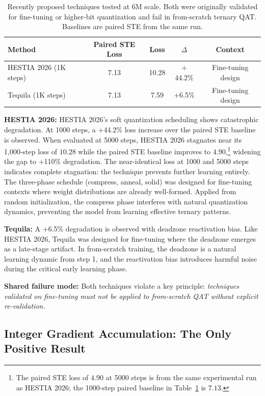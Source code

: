 \documentclass{article}
\begin{document}
\begin{table}[t]
\centering
\small
\caption{Recently proposed techniques tested at 6M scale. Both were originally validated for fine-tuning or higher-bit quantization and fail in from-scratch ternary QAT. Baselines are paired STE from the same run.}
\label{tab:recent}
\begin{tabular}{lcccc}
\toprule
\textbf{Method} & \textbf{Paired STE Loss} & \textbf{Loss} & \textbf{$\Delta$} & \textbf{Context} \\
\midrule
HESTIA 2026 (1K steps) & 7.13 & 10.28 & $+$44.2\% & Fine-tuning design \\
Tequila (1K steps) & 7.13 & 7.59 & $+$6.5\% & Fine-tuning design \\
\bottomrule
\end{tabular}
\end{table}

\textbf{HESTIA 2026:} HESTIA 2026's soft quantization scheduling shows catastrophic degradation. At 1000 steps, a $+$44.2\% loss increase over the paired STE baseline is observed. When evaluated at 5000 steps, HESTIA 2026 stagnates near its 1{,}000-step loss of $10.28$ while the paired STE baseline improves to $4.90$,\footnote{The paired STE loss of $4.90$ at 5000 steps is from the same experimental run as HESTIA 2026; the 1000-step paired baseline in Table~\ref{tab:recent} is $7.13$.} widening the gap to $+$110\% degradation. The near-identical loss at 1000 and 5000 steps indicates complete stagnation: the technique prevents further learning entirely. The three-phase schedule (compress, anneal, solid) was designed for fine-tuning contexts where weight distributions are already well-formed. Applied from random initialization, the compress phase interferes with natural quantization dynamics, preventing the model from learning effective ternary patterns.

\textbf{Tequila:} A $+$6.5\% degradation is observed with deadzone reactivation bias. Like HESTIA 2026, Tequila was designed for fine-tuning where the deadzone emerges as a late-stage artifact. In from-scratch training, the deadzone is a natural learning dynamic from step 1, and the reactivation bias introduces harmful noise during the critical early learning phase.

\textbf{Shared failure mode:} Both techniques violate a key principle: \textit{techniques validated on fine-tuning must not be applied to from-scratch QAT without explicit re-validation.}

\subsection{Integer Gradient Accumulation: The Only Positive Result}
\end{document}
